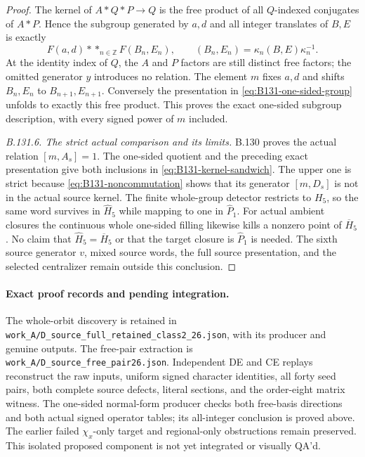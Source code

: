 \begin{proof}
The kernel of $A*Q*P\to Q$ is the free product of all $Q$-indexed
conjugates of $A*P$. Hence the subgroup generated by $a,d$ and all
integer translates of $B,E$ is exactly
\[
 F(a,d)*\mathop{*}_{n\in\mathbb Z}F(B_n,E_n),\qquad
 (B_n,E_n)=\kappa_n(B,E)\kappa_n^{-1}.
\]
At the identity index of $Q$, the $A$ and $P$ factors are still distinct free factors;
the omitted generator $y$ introduces no relation. The element $m$
fixes $a,d$ and shifts $B_n,E_n$ to $B_{n+1},E_{n+1}$. Conversely the
presentation in \eqref{eq:B131-one-sided-group} unfolds to exactly this
free product. This proves the exact one-sided subgroup description,
with every signed power of $m$ included.

\emph{B.131.6. The strict actual comparison and its limits.}
B.130 proves the actual relation $[m,A_s]=1$. The one-sided quotient
and the preceding exact presentation give both inclusions in
\eqref{eq:B131-kernel-sandwich}. The upper one is strict because
\eqref{eq:B131-noncommutation} shows that its generator $[m,D_s]$
is not in the actual source kernel.
The finite whole-group detector restricts to $H_5$, so the same word
survives in $\widehat H_5$ while mapping to one in $\widehat P_1$.
For actual ambient closures the continuous whole one-sided filling
likewise kills a nonzero point of $\overline H_5$. No claim that
$\widehat H_5=\overline H_5$ or that the target closure is
$\widehat P_1$ is needed. The sixth source generator $v$, mixed source
words, the full source presentation, and the selected centralizer
remain outside this conclusion.
\end{proof}

\paragraph{Exact proof records and pending integration.}
The whole-orbit discovery is retained in
\texttt{work\_A/D\_source\_full\_retained\_class2\_26.json}, with
its producer and genuine outputs. The free-pair extraction is
\texttt{work\_A/D\_source\_free\_pair26.json}. Independent DE and CE
replays reconstruct the raw inputs, uniform signed character identities,
all forty seed pairs, both complete source defects, literal sections,
and the order-eight matrix witness. The one-sided normal-form producer
checks both free-basis directions and both actual signed operator tables;
its all-integer conclusion is proved above. The earlier failed
$\chi_x$-only target and regional-only obstructions remain preserved.
This isolated proposed component is not yet integrated or visually QA'd.
